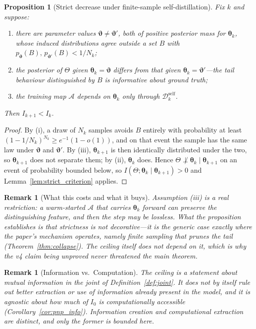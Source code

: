 \documentclass[11pt,a4paper]{article}
\newtheorem{proposition}[theorem]{Proposition}
\newtheorem{remark}[theorem]{Remark}
\begin{document}
\begin{proposition}[Strict decrease under finite-sample self-distillation]
\label{prop:strict_finite}
Fix $k$ and suppose:
\begin{enumerate}
    \item there are parameter values $\bm{\vartheta} \neq \bm{\vartheta}'$, both of positive posterior mass for $\bm{\theta}_k$, whose induced distributions agree outside a set $B$ with $p_{\bm{\vartheta}}(B),\, p_{\bm{\vartheta}'}(B) < 1/N_k$;
    \item the posterior of $\Theta$ given $\bm{\theta}_k = \bm{\vartheta}$ differs from that given $\bm{\theta}_k = \bm{\vartheta}'$---the tail behaviour distinguished by $B$ is informative about ground truth;
    \item the training map $\mathcal{A}$ depends on $\bm{\theta}_k$ only through $\mathcal{D}_k^{\mathrm{self}}$.
\end{enumerate}
Then $I_{k+1} < I_k$.
\end{proposition}

\begin{proof}
By (i), a draw of $N_k$ samples avoids $B$ entirely with probability at least $(1 - 1/N_k)^{N_k} \geq e^{-1}(1-o(1))$, and on that event the sample has the same law under $\bm{\vartheta}$ and $\bm{\vartheta}'$. By (iii), $\bm{\theta}_{k+1}$ is then identically distributed under the two, so $\bm{\theta}_{k+1}$ does not separate them; by (ii), $\bm{\theta}_k$ does. Hence $\Theta \not\perp \bm{\theta}_k \mid \bm{\theta}_{k+1}$ on an event of probability bounded below, so $I(\Theta; \bm{\theta}_k \mid \bm{\theta}_{k+1}) > 0$ and Lemma~\ref{lem:strict_criterion} applies.
\end{proof}

\begin{remark}[What this costs and what it buys]
\label{rem:no_strictness}
Assumption (iii) is a real restriction: a warm-started $\mathcal{A}$ that carries $\bm{\theta}_k$ forward can preserve the distinguishing feature, and then the step may be lossless. What the proposition establishes is that strictness is not decorative---it is the generic case exactly where the paper's mechanism operates, namely finite sampling that prunes the tail (Theorem~\ref{thm:collapse}). The ceiling itself does not depend on it, which is why the v4 claim being unproved never threatened the main theorem.
\end{remark}

\begin{remark}[Information vs.\ Computation]
The ceiling is a statement about mutual information in the joint of Definition~\ref{def:joint}. It does not by itself rule out better extraction or use of information already present in the model, and it is agnostic about how much of $I_0$ is computationally accessible (Corollary~\ref{cor:pnp_info}). Information creation and computational extraction are distinct, and only the former is bounded here.
\end{remark}
\end{document}

